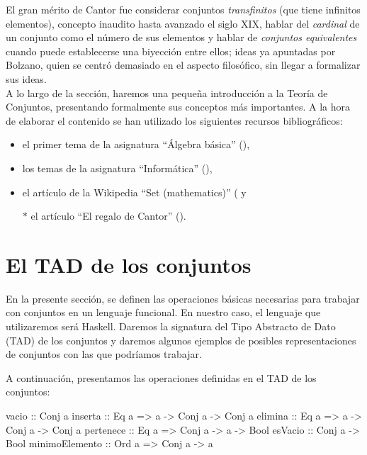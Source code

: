 El gran mérito de Cantor fue considerar conjuntos \textit{transfinitos} (que
tiene infinitos elementos), concepto inaudito hasta avanzado el siglo XIX,
hablar del \textit{cardinal} de un conjunto como el número de sus elementos y
hablar de \textit{conjuntos equivalentes} cuando puede establecerse una
biyección entre ellos; ideas ya apuntadas por Bolzano, quien se centró
demasiado en el aspecto filosófico, sin llegar a formalizar sus ideas.\\


A lo largo de la sección, haremos una pequeña introducción a la Teoría de
Conjuntos, presentando formalmente sus conceptos más importantes. A la hora de 
elaborar el contenido se han utilizado los siguientes recursos bibliográficos:

\begin{itemize}
\item el primer tema de la asignatura ``Álgebra básica'' (\cite{Algebra-15a}),
\item los temas de la asignatura ``Informática'' (\cite{Alonso-15a}),
\item el artículo de la Wikipedia ``Set (mathematics)''
  (\cite{Wikipedia-conjuntos} y
\item[$*$] el artículo ``El regalo de Cantor'' (\cite{Regalo-cantor}).
\end{itemize}

\section{El TAD de los conjuntos}

\label{sec:TAD_conjuntos}

En la presente sección, se definen las operaciones básicas necesarias
para trabajar con conjuntos en un lenguaje funcional. En nuestro caso, 
el lenguaje que utilizaremos será Haskell. Daremos la signatura del Tipo
Abstracto de Dato (TAD) de los conjuntos y daremos algunos ejemplos de 
posibles representaciones de conjuntos con las que podríamos trabajar.

A continuación, presentamos las operaciones definidas en el TAD de los 
conjuntos:

\begin{code}
vacio          :: Conj a                         
inserta        :: Eq a => a -> Conj a -> Conj a
elimina        :: Eq a => a -> Conj a -> Conj a
pertenece      :: Eq a => Conj a -> a -> Bool  
esVacio        :: Conj a -> Bool
minimoElemento :: Ord a => Conj a -> a
\end{code}

